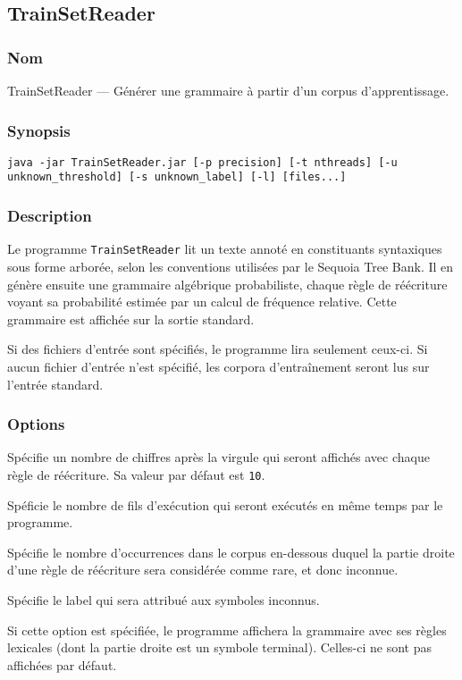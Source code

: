 \documentclass[12pt]{article}
\begin{document}
\subsection{TrainSetReader}
\subsubsection{Nom}
 
TrainSetReader --- Générer une grammaire à partir d'un corpus d'apprentissage.
 
\subsubsection{Synopsis}
 
{\ttfamily
\begin{verbatim}
java -jar TrainSetReader.jar [-p precision] [-t nthreads] [-u
unknown_threshold] [-s unknown_label] [-l] [files...]
\end{verbatim}
}
 
\subsubsection{Description}
 
Le programme \texttt{TrainSetReader} lit un texte annoté en constituants
syntaxiques sous forme arborée, selon les conventions utilisées par le Sequoia Tree Bank. Il en
génère ensuite une grammaire algébrique probabiliste, chaque règle de réécriture
voyant sa probabilité estimée par un calcul de fréquence relative. Cette
grammaire est affichée sur la sortie standard.
 
Si des fichiers d'entrée sont spécifiés, le programme lira seulement ceux-ci. Si
aucun fichier d'entrée n'est spécifié, les corpora d'entraînement seront lus sur
l'entrée standard.

\subsubsection{Options}

\begin{description}[style=nextline]
\item[\texttt{-p, --precision precision}] Spécifie un nombre de chiffres après
la virgule qui seront affichés avec chaque règle de réécriture. Sa valeur par défaut est
\texttt{10}.
\item[\texttt{-t, --nthreads threads}] Spéficie le nombre de fils d'exécution
qui seront exécutés en même temps par le programme.
\item[\texttt{-u, --unknown-threshold unknown\_threshold}] Spécifie le nombre
d'occurrences dans le corpus en-dessous duquel la partie droite d'une règle de
réécriture sera considérée comme rare, et donc inconnue.
\item[\texttt{-s, --unknown-label unknown\_label}] Spécifie le label qui sera
attribué aux symboles inconnus.
\item[\texttt{-l, --lexical}] Si cette option est spécifiée, le programme
affichera la grammaire avec ses règles lexicales (dont la partie droite est un
symbole terminal). Celles-ci ne sont pas affichées par défaut.
\end{description}
\end{document}
